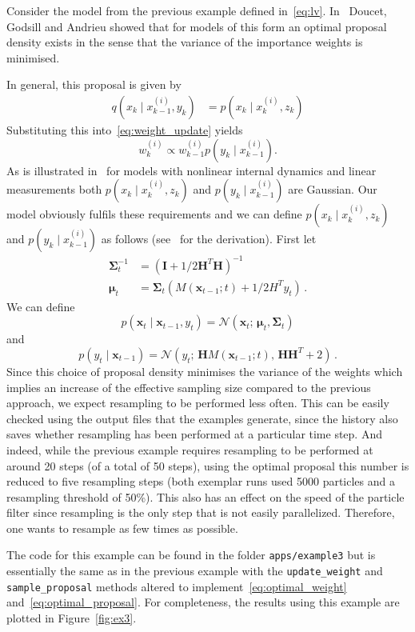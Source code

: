 \begin{example}\label{ex:lv2}
  Consider the model from the previous example defined
  in~\eqref{eq:lv}. In~\cite{Doucet2000} Doucet, Godsill and Andrieu
  showed that for models of this form an optimal proposal density
  exists in the sense that the variance of the importance weights is
  minimised.

  In general, this proposal is given by
  \begin{align*}
    q(x_k \mid x^{(i)}_{k-1}, y_k) &= p(x_k \mid x_k^{(i)}, z_k)
  \end{align*}
  Substituting this into~\eqref{eq:weight_update} yields
  \[
    w_k^{(i)} \propto w_{k-1}^{(i)} p(y_k \mid x_{k-1}^{(i)}).
  \]
  As is illustrated in~\cite[Example 3]{Doucet2000} for models with
  nonlinear internal dynamics and linear measurements both
  $p(x_k \mid x_k^{(i)}, z_k)$ and $p(y_k \mid x_{k-1}^{(i)})$ are
  Gaussian. Our model obviously fulfils these requirements and we can
  define $p(x_k \mid x_k^{(i)}, z_k)$ and $p(y_k \mid x_{k-1}^{(i)})$
  as follows (see~\cite{Doucet2000} for the derivation). First let
  \begin{align*}
    \bm{\Sigma}_t^{-1} &= {(\bm{I} + 1/2 \bm{H}^T \bm{H})}^{-1}\,\\
    \bm{\mu}_t &= \bm{\Sigma}_t (M(\bm{x}_{t-1}; t) + 1/2 H^T y_t)\,.
  \end{align*}
  We can define
  \begin{equation}
    \label{eq:optimal_proposal}
    p(\bm{x}_t \mid \bm{x}_{t-1}, y_t) = \mathcal{N}(\bm{x}_t;\, \bm{\mu}_t, \bm{\Sigma}_t)
  \end{equation}
  and
  \begin{equation}
    \label{eq:optimal_weight}
    p(y_t \mid \bm{x}_{t-1}) = \mathcal{N}(y_t; \, \bm{H} M(\bm{x}_{t-1}; t), \,  \bm{H} \bm{H}^T + 2)\,.
  \end{equation}
  Since this choice of proposal density minimises the variance of the
  weights which implies an increase of the effective sampling size
  compared to the previous approach, we expect resampling to be
  performed less often. This can be easily checked using the output
  files that the examples generate, since the history also saves
  whether resampling has been performed at a particular time step. And
  indeed, while the previous example requires resampling to be
  performed at around 20 steps (of a total of 50 steps), using the
  optimal proposal this number is reduced to five resampling steps
  (both exemplar runs used 5000 particles and a resampling threshold
  of 50\%). This also has an effect on the speed of the particle
  filter since resampling is the only step that is not easily
  parallelized. Therefore, one wants to resample as few times as
  possible.

  The code for this example can be found in the folder
  \texttt{apps/example3} but is essentially the same as in the
  previous example with the \texttt{update\_weight} and
  \texttt{sample\_proposal} methods altered to
  implement~\eqref{eq:optimal_weight} and~\eqref{eq:optimal_proposal}.
  For completeness, the results using this example are plotted in
  Figure~\ref{fig:ex3}.
\end{example}

